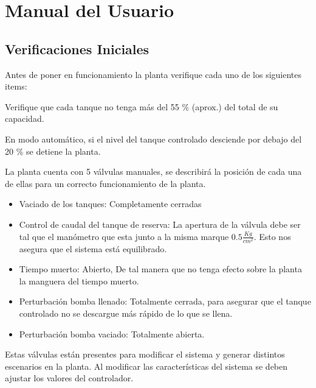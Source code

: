 \chapter{Manual del Usuario}
\label{anexo:manualUsuario}


\section{Verificaciones Iniciales}
\label{anexo:verificaciones}
Antes de poner en funcionamiento la planta verifique cada uno de los siguientes 
items:


\begin{tcolorbox}[title=Nivel de agua]
Verifique que cada tanque no tenga más del 55 \% (aprox.) del total de su 
capacidad. 
\end {tcolorbox}
\begin{lattention}
En modo automático, si el nivel del tanque controlado desciende por debajo del 
20 \% se detiene la planta. 
\end{lattention}



\begin{tcolorbox}[title=Válvulas manuales, breakable]
La planta cuenta con 5 válvulas manuales, se describirá la posición de cada una 
de ellas para un correcto funcionamiento de la planta. 
 
 \begin{itemize}
  \item Vaciado de los tanques: Completamente cerradas
  \item Control de caudal del tanque de reserva:
  La apertura de la válvula debe ser tal que el manómetro que esta junto
  a la misma marque $0.5\frac{Kg}{cm^2}$. Esto nos asegura que el sistema está 
  equilibrado.
  \item Tiempo muerto: Abierto, De tal manera que no tenga efecto sobre la 
  planta la manguera del tiempo muerto.
  \item Perturbación bomba llenado: Totalmente cerrada, para asegurar que el 
  tanque controlado no se descargue más rápido de lo que se llena.
  \item Perturbación bomba vaciado: Totalmente abierta.
 \end{itemize}
 \tcblower
 Estas válvulas están presentes para modificar el sistema y generar distintos 
escenarios en la planta. Al modificar las características del sistema se deben 
ajustar los valores del controlador.
\end {tcolorbox}


